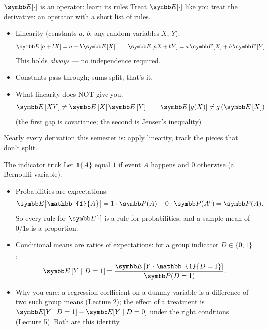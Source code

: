 \documentclass[aspectratio=169,11pt]{beamer}
\begin{document}
\begin{frame}{$\E[\cdot]$ is an operator: learn its rules}
Treat $\E[\cdot]$ like you treat the derivative: an \alert{operator} with a short list of rules.
\begin{itemize}
	\item \alert{Linearity} (constants $a$, $b$; any random variables $X$, $Y$):\[
		\E\left[a + bX\right] = a + b\,\E\left[X\right] \quad \quad
		\E\left[aX + bY\right] = a\,\E\left[X\right] + b\,\E\left[Y\right]
	\]
	This holds \emph{always} --- no independence required.

	\medskip
	\item Constants pass through; sums split; that's it.

	\medskip
	\item What linearity does NOT give you:\[
		\E\left[XY\right] \neq \E\left[X\right]\E\left[Y\right] \quad \quad
		\E\left[g(X)\right] \neq g\left(\E\left[X\right]\right)
	\]
	(the first gap is \alert{covariance}; the second is \alert{Jensen's inequality})
\end{itemize}
\medskip
Nearly every derivation this semester is: apply linearity, track the pieces that don't split.
\end{frame}


\begin{frame}{The indicator trick}
Let $\mathbb{1}\{A\}$ equal $1$ if event $A$ happens and $0$ otherwise (a Bernoulli variable).
\begin{itemize}
	\item \alert{Probabilities are expectations:}\[
		\E\big[\mathbb{1}\{A\}\big] = 1 \cdot \Pr(A) + 0 \cdot \Pr(A^c) = \Pr(A).
	\]
	So every rule for $\E[\cdot]$ is a rule for probabilities, and a sample mean of $0/1$s is a proportion.
	\medskip
	\item \alert{Conditional means are ratios of expectations:} for a group indicator $D \in \{0, 1\}$,\[
		\E\left[Y \mid D = 1\right] = \frac{\E\left[Y \cdot \mathbb{1}\{D = 1\}\right]}{\Pr(D = 1)} .
	\]
	\medskip
	\item Why you care: a regression coefficient on a dummy variable is a difference of two such
	group means (Lecture 2); the effect of a treatment is $\E[Y \mid D = 1] - \E[Y \mid D = 0]$ under the
	right conditions (Lecture 5). Both are this identity.
\end{itemize}
\end{frame}
\end{document}
